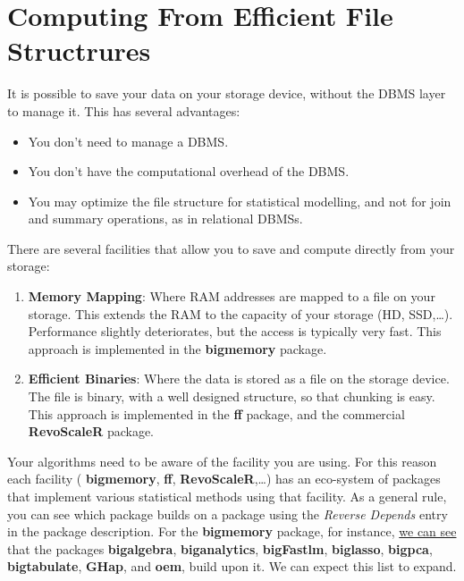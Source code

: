 \documentclass[]{book}
\providecommand{\tightlist}{%
  \setlength{\itemsep}{0pt}\setlength{\parskip}{0pt}}
\theoremstyle{definition}
\theoremstyle{definition}
\theoremstyle{definition}
\theoremstyle{remark}
\begin{document}
\section{Computing From Efficient File
Structrures}\label{file-structure}

It is possible to save your data on your storage device, without the
DBMS layer to manage it. This has several advantages:

\begin{itemize}
\tightlist
\item
  You don't need to manage a DBMS.
\item
  You don't have the computational overhead of the DBMS.
\item
  You may optimize the file structure for statistical modelling, and not
  for join and summary operations, as in relational DBMSs.
\end{itemize}

There are several facilities that allow you to save and compute directly
from your storage:

\begin{enumerate}
\def\labelenumi{\arabic{enumi}.}
\item
  \textbf{Memory Mapping}: Where RAM addresses are mapped to a file on
  your storage. This extends the RAM to the capacity of your storage
  (HD, SSD,\ldots{}). Performance slightly deteriorates, but the access
  is typically very fast. This approach is implemented in the
  \textbf{bigmemory} package.
\item
  \textbf{Efficient Binaries}: Where the data is stored as a file on the
  storage device. The file is binary, with a well designed structure, so
  that chunking is easy. This approach is implemented in the \textbf{ff}
  package, and the commercial \textbf{RevoScaleR} package.
\end{enumerate}

Your algorithms need to be aware of the facility you are using. For this
reason each facility ( \textbf{bigmemory}, \textbf{ff},
\textbf{RevoScaleR},\ldots{}) has an eco-system of packages that
implement various statistical methods using that facility. As a general
rule, you can see which package builds on a package using the
\emph{Reverse Depends} entry in the package description. For the
\textbf{bigmemory} package, for instance,
\href{https://cran.r-project.org/web/packages/bigmemory/index.html}{we
can see} that the packages \textbf{bigalgebra}, \textbf{biganalytics},
\textbf{bigFastlm}, \textbf{biglasso}, \textbf{bigpca},
\textbf{bigtabulate}, \textbf{GHap}, and \textbf{oem}, build upon it. We
can expect this list to expand.
\end{document}
